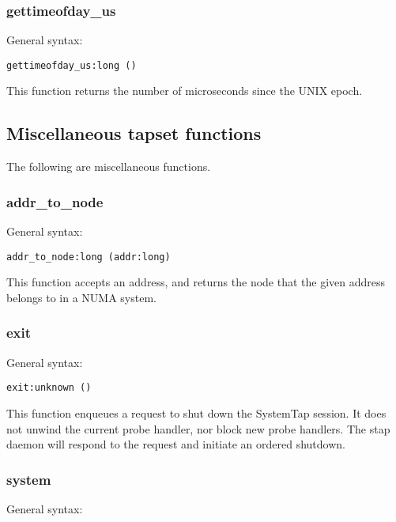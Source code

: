 \documentclass[twoside,english]{article}
\newenvironment{vindent}
{\begin{list}{}{\setlength{\listparindent}{6pt}}
\item[]}
{\end{list}}
\begin{document}
\subsubsection{gettimeofday\_us}
General syntax:

\begin{vindent}
\begin{verbatim}
gettimeofday_us:long ()
\end{verbatim}
\end{vindent}
This function returns the number of microseconds since the UNIX epoch.


\subsection{Miscellaneous tapset functions}

The following are miscellaneous functions.


\subsubsection{addr\_to\_node}
General syntax:

\begin{vindent}
\begin{verbatim}
addr_to_node:long (addr:long)
\end{verbatim}
\end{vindent}
This function accepts an address, and returns the node that the given address
belongs to in a NUMA system.


\subsubsection{exit}
General syntax:

\begin{vindent}
\begin{verbatim}
exit:unknown ()
\end{verbatim}
\end{vindent}
This function enqueues a request to shut down the SystemTap session. It does
not unwind the current probe handler, nor block new probe handlers. The stap
daemon will respond to the request and initiate an ordered shutdown.


\subsubsection{system}
General syntax:
\end{document}
